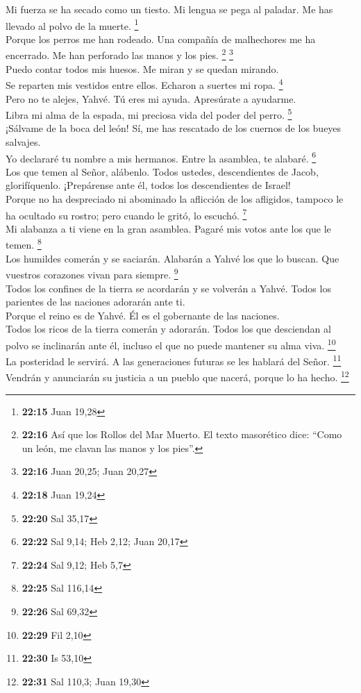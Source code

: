  Mi fuerza se ha secado como un tiesto. Mi lengua se pega
al paladar. Me has llevado al polvo de la muerte. \footnote{\textbf{22:15}
  Juan 19,28}\\
 Porque los perros me han rodeado. Una compañía de
malhechores me ha encerrado. Me han perforado las manos y los pies.
\footnote{\textbf{22:16} Así que los Rollos del Mar Muerto. El texto
  masorético dice: ``Como un león, me clavan las manos y los pies''.}
\footnote{\textbf{22:16} Juan 20,25; Juan 20,27}\\
 Puedo contar todos mis huesos. Me miran y se quedan
mirando.\\
 Se reparten mis vestidos entre ellos. Echaron a suertes
mi ropa. \footnote{\textbf{22:18} Juan 19,24}\\
 Pero no te alejes, Yahvé. Tú eres mi ayuda. Apresúrate a
ayudarme.\\
 Libra mi alma de la espada, mi preciosa vida del poder
del perro. \footnote{\textbf{22:20} Sal 35,17}\\
 ¡Sálvame de la boca del león! Sí, me has rescatado de
los cuernos de los bueyes salvajes.\\
 Yo declararé tu nombre a mis hermanos. Entre la
asamblea, te alabaré. \footnote{\textbf{22:22} Sal 9,14; Heb 2,12; Juan
  20,17}\\
 Los que temen al Señor, alábenlo. Todos ustedes,
descendientes de Jacob, glorifíquenlo. ¡Prepárense ante él, todos los
descendientes de Israel!\\
 Porque no ha despreciado ni abominado la aflicción de
los afligidos, tampoco le ha ocultado su rostro; pero cuando le gritó,
lo escuchó. \footnote{\textbf{22:24} Sal 9,12; Heb 5,7}\\
 Mi alabanza a ti viene en la gran asamblea. Pagaré mis
votos ante los que le temen. \footnote{\textbf{22:25} Sal 116,14}\\
 Los humildes comerán y se saciarán. Alabarán a Yahvé los
que lo buscan. Que vuestros corazones vivan para siempre. \footnote{\textbf{22:26}
  Sal 69,32}\\
 Todos los confines de la tierra se acordarán y se
volverán a Yahvé. Todos los parientes de las naciones adorarán ante
ti.\\
 Porque el reino es de Yahvé. Él es el gobernante de las
naciones.\\
 Todos los ricos de la tierra comerán y adorarán. Todos
los que desciendan al polvo se inclinarán ante él, incluso el que no
puede mantener su alma viva. \footnote{\textbf{22:29} Fil 2,10}\\
 La posteridad le servirá. A las generaciones futuras se
les hablará del Señor. \footnote{\textbf{22:30} Is 53,10}\\
 Vendrán y anunciarán su justicia a un pueblo que nacerá,
porque lo ha hecho. \footnote{\textbf{22:31} Sal 110,3; Juan 19,30}

